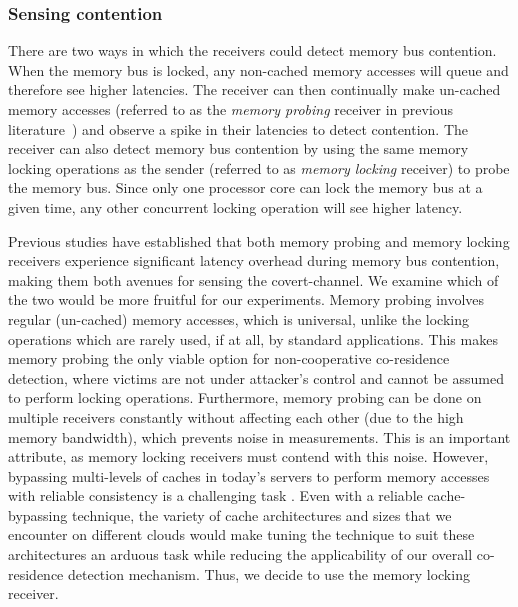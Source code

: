 \subsubsection{Sensing contention} 
There are two ways in which the receivers could detect memory bus contention.
When the memory bus is locked, any non-cached memory accesses will queue and
therefore see higher latencies. The receiver can then continually make un-cached
memory accesses (referred to as the \textit{memory probing} receiver in previous
literature~\cite{varadarajan2015}) and observe a spike in their latencies to
detect contention.  The receiver can also detect memory bus contention by using
the same memory locking operations as the sender (referred to as \textit{memory
locking} receiver) to probe the memory bus. Since only one processor core can
lock the memory bus at a given time, any other concurrent locking operation will
see higher latency. 

Previous studies\cite{wuusenix2012,varadarajan2015} have established that both
memory probing and memory locking receivers experience significant latency
overhead during memory bus contention, making them both avenues for sensing the
covert-channel. We examine which of the two would be more fruitful for our
experiments. Memory probing involves regular (un-cached) memory accesses, which
is universal, unlike the locking operations which are rarely used, if at all, by
standard applications. This makes memory probing the only viable option for
non-cooperative co-residence detection, where victims are not under attacker's
control and cannot be assumed to perform locking operations. Furthermore, memory
probing can be done on multiple receivers constantly without affecting each
other (due to the high memory bandwidth), which prevents noise in measurements.
This is an important attribute, as memory locking receivers must contend with
this noise. However, bypassing multi-levels of caches in today's servers to
perform memory accesses with reliable consistency is a challenging task
. Even with a reliable cache-bypassing technique, the
variety of cache architectures and sizes that we encounter on different clouds
would make tuning the technique to suit these architectures an arduous task
while reducing the applicability of our overall co-residence detection
mechanism.  Thus, we decide to use the memory locking receiver.


